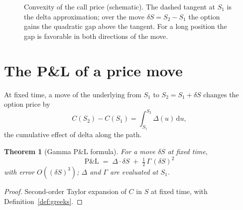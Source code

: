 \documentclass[11pt]{book}
\theoremstyle{plain}
\newtheorem{theorem}{Theorem}[chapter]
\theoremstyle{definition}
\theoremstyle{remark}
\newcommand{\dd}{\mathrm{d}}                                  %
\begin{document}
\begin{figure}[t]
\centering
{}
\caption{Convexity of the call price (schematic). The dashed tangent at $S_1$ is the delta approximation; over the move $\delta S = S_2 - S_1$ the option gains the quadratic gap above the tangent. For a long position the gap is favorable in both directions of the move.}
\label{fig:convexity}
\end{figure}

\section{The P\&L of a price move}
\label{sec:gamma-pnl}

At fixed time, a move of the underlying from $S_1$ to $S_2 = S_1 + \delta S$ changes the option price by
\begin{equation}
C(S_2) - C(S_1) = \int_{S_1}^{S_2} \Delta(u)\,\dd u,
\label{eq:exact-integral}
\end{equation}
the cumulative effect of delta along the path.

\begin{theorem}[Gamma P\&L formula]
\label{thm:gamma-pnl}
For a move $\delta S$ at fixed time,
\begin{equation}
\boxed{\;\mathrm{P\&L} \;=\; \Delta\cdot\delta S \;+\; \tfrac12\,\Gamma\,(\delta S)^2\;}
\label{eq:gamma-pnl}
\end{equation}
with error $O\!\left((\delta S)^3\right)$; $\Delta$ and $\Gamma$ are evaluated at $S_1$.
\end{theorem}

\begin{proof}
Second-order Taylor expansion of $C$ in $S$ at fixed time, with Definition~\ref{def:greeks}.
\end{proof}
\end{document}
